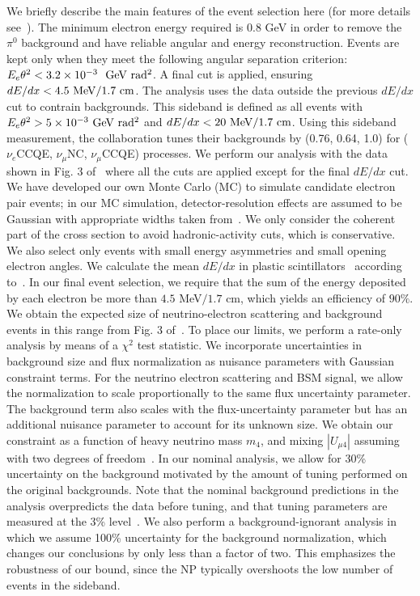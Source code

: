 We briefly describe the main features of the \minerva event selection here (for more details see~\cite{Park:2015eqa}). The minimum electron energy required is $0.8$ GeV in order to remove the $\pi^0$ background and have reliable angular and energy reconstruction. Events are kept only when they meet the following angular separation criterion: $E_e \theta^2 < 3.2\times 10^{-3}~{\rm ~GeV ~rad^2}$. A final cut is applied, ensuring $dE/dx < 4.5~{\rm MeV} / 1.7~{\rm cm}$. The \minerva analysis uses the data outside the previous $dE/dx$ cut to contrain backgrounds. This sideband is defined as all events with $E_e\theta^2 > 5 \times 10^{-3} {\rm ~GeV ~rad^2}$ and $dE/dx < 20~{\rm MeV}/1.7~{\rm cm}$. Using this sideband measurement, the collaboration tunes their backgrounds by (0.76, 0.64, 1.0) for ($\nu_e$CCQE, $\nu_\mu$NC, $\nu_\mu$CCQE) processes. 
We perform our analysis with the data shown in Fig. 3 of~\cite{Park:2015eqa} where all the cuts are applied except for the final $dE/dx$ cut. We have developed our own Monte Carlo (MC) to simulate candidate electron pair events; in our MC simulation, detector-resolution effects are assumed to be Gaussian with appropriate widths taken from~\cite{Aliaga:2013uqz}. We only consider the coherent part of the cross section to avoid hadronic-activity cuts, which is conservative. We also select only events with small energy asymmetries and small opening electron angles. We calculate the mean $dE/dx$ in plastic scintillators~\cite{NIST:2018} according to~\cite{Leo:1987kd,Tanabashi:2018oca}. 
In our final event selection, we require that the sum of the energy deposited by each electron be more than $4.5$ MeV$/ 1.7$ cm, which yields an efficiency of $90\%$. We obtain the expected size of neutrino-electron scattering and background events in this range from Fig. 3 of~\cite{Park:2015eqa}. To place our limits, we perform a rate-only analysis by means of a $\chi^2$ test statistic. We incorporate uncertainties in background size and flux normalization as nuisance parameters with Gaussian constraint terms. For the neutrino electron scattering and BSM signal, we allow the normalization to scale proportionally to the same flux uncertainty parameter. 
The background term also scales with the flux-uncertainty parameter but has an additional nuisance parameter to account for its unknown size. We obtain our constraint as a function of heavy neutrino mass $m_4$, and mixing $|U_{\mu 4}|$ assuming with two degrees of freedom~\cite{Tanabashi:2018oca}.
In our nominal \minerva analysis, we allow for 30\% uncertainty on the background motivated by the amount of tuning performed on the original backgrounds. Note that the nominal background predictions in the \minerva analysis overpredicts the data before tuning, and that tuning parameters are measured at the 3\% level~\cite{Park:2013dax}.
We also perform a background-ignorant analysis in which we assume 100\% uncertainty for the background normalization, which changes our conclusions by only less than a factor of two. This emphasizes the robustness of our \minerva bound, since the NP typically overshoots the low number of events in the sideband.



